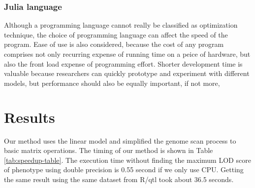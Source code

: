 \documentclass[9pt,twocolumn,twoside,lineno]{gsag3jnl}
\begin{document}
\subsubsection{Julia language}
Although a programming language cannot really be classified as optimization technique, the choice of programming language can affect the speed of the program. 
Ease of use is also considered, because the cost of any program comprises not only recurring expense of running time on a peice of hardware, but also the front load expense of programming effort. 
Shorter development time is valuable because researchers can quickly prototype and experiment with different models, but performance should also be equally important, if not more, 


\section{Results} 

Our method uses the linear model and simplified the genome scan process to basic matrix operations. 
The timing of our method is shown in Table \ref{tab:speedup-table}. 
The execution time without finding the maximum LOD score of phenotype using double precision is 0.55 second if we only use CPU. 
Getting the same result using the same dataset from R/qtl took about 36.5 seconds. 
\end{document}
